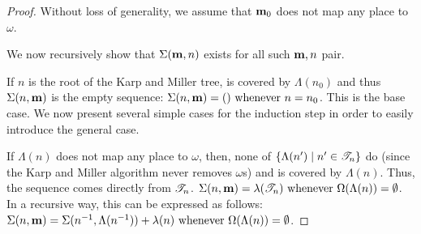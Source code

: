 \begin{proof}
  Without loss of generality, we assume that $\mathbf{m}_0$ does not map any place to $\omega$.

  We now recursively show that $\Sigma(\mathbf{m}, n)$ exists for all such $\mathbf{m}, n$ pair.

  If $n$ is the root of the Karp and Miller tree, \mar is covered by $\Lambda(n_0)$ and thus $\Sigma(n, \mathbf{m})$ is the empty sequence:
  \( \Sigma(n, \mathbf{m}) = () \text{ whenever } n = n_0 \).
  This is the base case.
  We now present several simple cases for the induction step in order to easily introduce the general case.

  If $\Lambda(n)$ does not map any place to $\omega$, then,
  none of $\left\{\Lambda(n') \mid n' \in \mathscr{T}_{n}\right\}$ do
  (since the Karp and Miller algorithm never removes $\omega$s)
  and \mar is covered by $\Lambda(n)$.
  Thus, the sequence comes directly from $\mathscr{T}_{n}$.
  \( \Sigma(n, \mathbf{m}) = \lambda(\mathscr{T}_{n}) \text{ whenever } \Omega(\Lambda(n)) = \emptyset \).
  In a recursive way, this can be expressed as follows: $\Sigma(n, \mathbf{m}) = \Sigma(n^{-1}, \Lambda(n^{-1})) + \lambda(n) \text{ whenever } \Omega(\Lambda(n)) = \emptyset$.


\end{proof}
